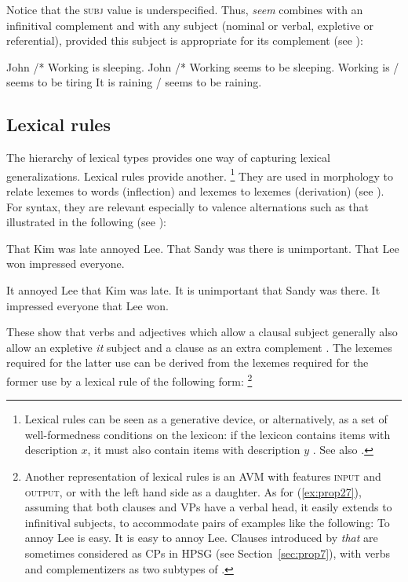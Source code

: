 \documentclass[output=paper
	        ,collection
	        ,collectionchapter
 	        ,biblatex
                ,babelshorthands
                ,newtxmath
                ,draftmode
                ,colorlinks, citecolor=brown
]{langscibook}
\begin{document}
\noindent
Notice that the \textsc{subj} value is underspecified. Thus, \emph{seem} combines with an
infinitival complement and with any subject (nominal or verbal, expletive or referential), provided
this subject is appropriate for its complement (see
): 

\eal\label{ex:prop25}
\ex John /* Working is sleeping.
\ex John /* Working seems to be sleeping.
\ex Working is / seems to be tiring
\ex It is raining / seems to be raining.
\zl

\subsection{Lexical rules}\label{sec:prop4.2}
\label{prop:sec-lex-rules}

The hierarchy of lexical types provides one way of capturing lexical generalizations. Lexical rules provide another.%
%
\footnote{Lexical rules can be seen as a generative device, or alternatively, as a set of
  well-formedness conditions on the lexicon: if the lexicon contains items with description $x$, it
  must also contain items with description $y$ \citep{Meurers2001a}. See also .}
%
They are used in morphology to relate lexemes to words (inflection) and lexemes to lexemes
(derivation) (see ). For syntax, they are relevant especially to valence alternations such as that illustrated in the following (see ):

\eal\label{ex:prop26}
\ex That Kim was late annoyed Lee.
\ex That Sandy was there is unimportant. 
\ex That Lee won impressed everyone.
\zl
	
\eal\label{ex:prop27}
\ex It annoyed Lee that Kim was late.
\ex It is unimportant that Sandy was there. 
\ex It impressed everyone that Lee won.
\zl

\noindent
These show that verbs and adjectives which allow a clausal subject generally also allow an expletive \emph{it} subject and a clause as an extra complement \citep[150]{ps2}. The lexemes required for the latter use can be derived from the lexemes required for the former use by a lexical rule of the following form:%
%
\footnote{Another representation of lexical rules is an AVM with features \textsc{input} and \textsc{output}, or with the left hand side as a daughter. As for (\ref{ex:prop27}), assuming that both clauses and VPs have a verbal head, it easily extends to infinitival subjects, to accommodate pairs of examples like the following:
	\eal
        \ex To annoy Lee is easy.
	\ex It is easy to annoy Lee.
	\zl
Clauses introduced by \emph{that} are sometimes considered as CPs in HPSG (see Section~\ref{sec:prop7}), with verbs and complementizers as two subtypes of .
}
%
\end{document}
